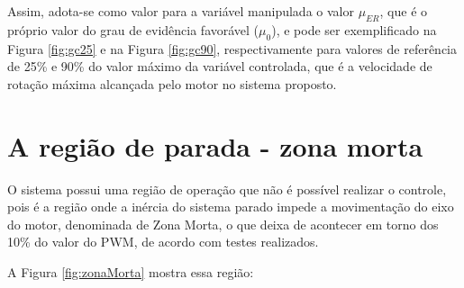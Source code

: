 Assim, adota-se como valor para a variável manipulada 
o valor $\mu_{ER}$, que é o próprio valor do 
grau de evidência favorável ($\mu_0$), 
e pode ser exemplificado na 
Figura \ref{fig:gc25} e na 
Figura \ref{fig:gc90}, 
respectivamente para valores de referência de 25\% e 90\%
do valor máximo da variável controlada, 
que é a velocidade de rotação máxima alcançada 
pelo motor no sistema proposto.










\section{A região de parada - zona morta}

O sistema possui uma região de operação 
que não é possível realizar o controle, 
pois é a região onde a inércia do sistema parado
impede a movimentação do eixo do motor,
denominada de Zona Morta,
o que deixa de acontecer em torno dos 10\% do valor do PWM,
de acordo com testes realizados.

A Figura \ref{fig:zonaMorta} mostra essa região:





